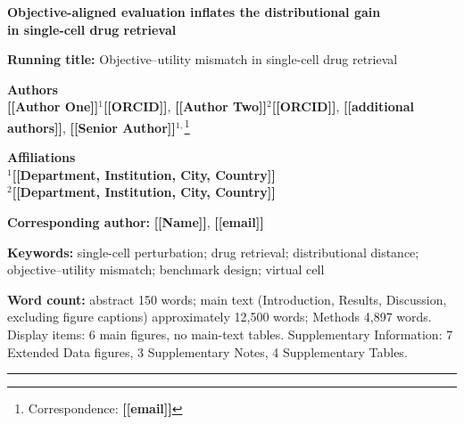 \documentclass[11pt,letterpaper]{article}
\newcommand{\TODO}[1]{{\color{BrickRed}\textbf{[[#1]]}}}
\begin{document}
\thispagestyle{empty}
\begin{flushleft}

{\LARGE\bfseries Objective-aligned evaluation inflates the distributional gain\\[2pt]
in single-cell drug retrieval\par}

\bigskip
\noindent\textbf{Running title:} Objective--utility mismatch in single-cell drug retrieval

\bigskip
\noindent\textbf{Authors}\\
\TODO{Author One}$^{1}$\TODO{ORCID}, \TODO{Author Two}$^{2}$\TODO{ORCID}, \TODO{additional authors}, \TODO{Senior Author}$^{1,}$\footnote{Correspondence: \TODO{email}}

\medskip
\noindent\textbf{Affiliations}\\
$^{1}$\TODO{Department, Institution, City, Country}\\
$^{2}$\TODO{Department, Institution, City, Country}

\medskip
\noindent\textbf{Corresponding author:} \TODO{Name}, \TODO{email}

\bigskip
\noindent\textbf{Keywords:} single-cell perturbation; drug retrieval; distributional distance;
objective--utility mismatch; benchmark design; virtual cell

\bigskip
\noindent\textbf{Word count:} abstract 150 words; main text (Introduction, Results, Discussion,
excluding figure captions) approximately 12{,}500 words; Methods 4{,}897 words. Display items: 6 main
figures, no main-text tables. Supplementary Information: 7 Extended Data figures, 3 Supplementary
Notes, 4 Supplementary Tables.

\end{flushleft}

\vfill
\noindent\rule{\textwidth}{0.4pt}

\clearpage
\end{document}
